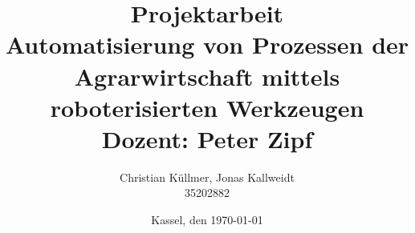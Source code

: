 \documentclass[a4paper,12pt,titlepage]{article}
\begin{document}
\title{{\textsf{Projektarbeit\\
	\glqq Automatisierung von Prozessen der Agrarwirtschaft mittels roboterisierten Werkzeugen\grqq \\
	\vspace{1ex}
	Dozent: Peter Zipf}}}
\author{Christian Küllmer, Jonas Kallweidt\\
	35202882}
\date{Kassel, den \today}

\maketitle       %
\tableofcontents %
\listoffigures   %
\listoftables    %



\end{document}
